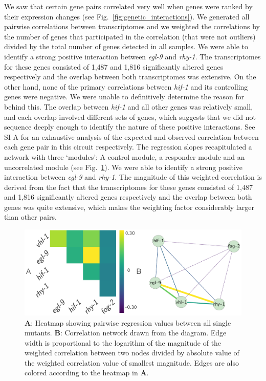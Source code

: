 \documentclass[9pt,twocolumn,twoside]{pnas-new}
\newcommand{\egl}{\emph{egl-9}}
\newcommand{\rhy}{\emph{rhy-1}}
\newcommand{\hif}{\emph{hif-1}}
\newcommand{\egln}{1,487}
\newcommand{\rhyn}{1,816}
\begin{document}
We saw that certain gene pairs correlated very well when genes were ranked by
their expression changes (see Fig.~\ref{fig:genetic_interactions}). We generated
all pairwise correlations between transcriptomes and we weighted the correlations
by the number of genes that participated in the correlation (that were not
outliers) divided by the total number of genes detected in all samples.
We were able to identify a strong positive interaction between \egl{} and \rhy{}.
The transcriptomes for these genes consisted of \egln{} and \rhyn{}
significantly altered genes respectively and the overlap between both
transcriptomes was extensive. On the other hand, none of the primary
correlations between \hif{} and its controlling genes were negative. We were
unable to definitively determine the reason for behind this. The overlap between
\hif{} and all other genes was relatively small, and each overlap involved
different sets of genes, which suggests that we did not sequence deeply enough
to identify the nature of these positive interactions. See SI A for an exhaustive
analysis of the expected and observed correlation between each gene pair in this
circuit respectively.
The regression slopes recapitulated a network with three `modules': A control
module, a responder module and an uncorrelated module (see Fig.~\ref{fig:heatmap}).
We were able to identify a strong positive interaction between \egl{} and \rhy{}.
The magnitude of this weighted correlation is derived from the fact that the
transcriptomes for these genes consisted of \egln{} and \rhyn{} significantly
altered genes respectively and the overlap between both genes was quite
extensive, which makes the weighting factor considerably larger than other pairs.

\begin{figure}[tbhp]
\centering
\includegraphics[width=\linewidth]{figs/bayesian_heat_map.pdf}
\caption{
\textbf{A}: Heatmap showing pairwise regression values between all
single mutants. \textbf{B}: Correlation network drawn from the diagram. Edge
width is proportional to the logarithm of the magnitude of the weighted
correlation between two nodes divided by absolute value of the weighted
correlation value of smallest magnitude. Edges are also colored according to the
heatmap in \textbf{A}.
}
\label{fig:heatmap}
\end{figure}
\end{document}

